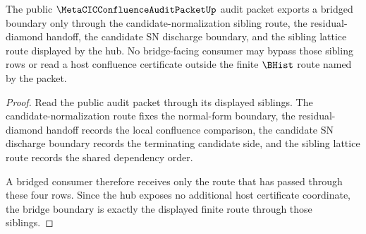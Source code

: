 \begin{theorem}
\label{thm:metacic-confluence-audit-bridge-boundary}
The public $\MetaCICConfluenceAuditPacketUp$ audit packet exports a bridged boundary only through the candidate-normalization sibling route, the residual-diamond handoff, the candidate SN discharge boundary, and the sibling lattice route displayed by the hub. No bridge-facing consumer may bypass those sibling rows or read a host confluence certificate outside the finite $\BHist$ route named by the packet.
\end{theorem}
\begin{proof}
Read the public audit packet through its displayed siblings. The candidate-normalization route fixes the normal-form boundary, the residual-diamond handoff records the local confluence comparison, the candidate SN discharge boundary records the terminating candidate side, and the sibling lattice route records the shared dependency order.

A bridged consumer therefore receives only the route that has passed through these four rows. Since the hub exposes no additional host certificate coordinate, the bridge boundary is exactly the displayed finite route through those siblings.
\end{proof}
